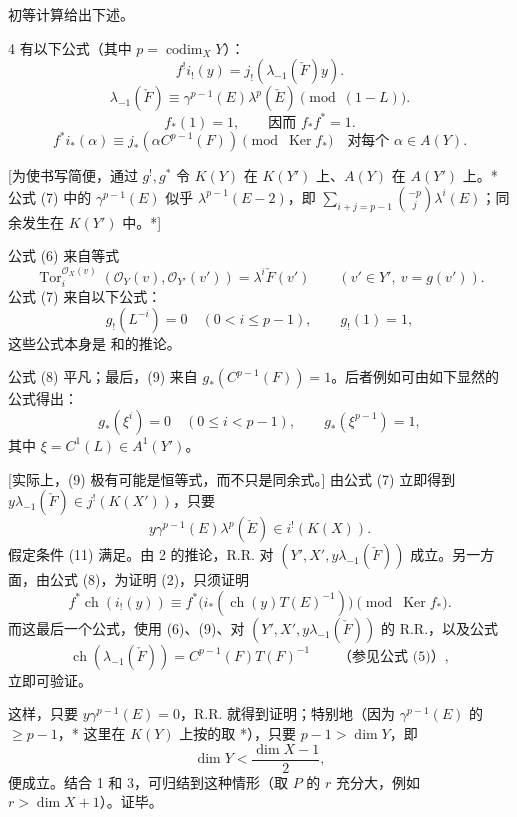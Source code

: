 初等计算给出下述。
\begin{SGAresult}{}{4}
有以下公式（其中 $p=\operatorname{codim}_X Y$）：
\[
f^!i_!(y)=j_!(\lambda_{-1}(\check F)y).\tag{6}
\]
\[
\lambda_{-1}(\check F)\equiv\gamma^{p-1}(E)\lambda^p(\check E)\pmod{(1-L)}.\tag{7}
\]\footnotemark
\[
f_*(1)=1,\qquad\text{因而 }f_*f^*=1.\tag{8}
\]
\[
f^*i_*(\alpha)\equiv j_*(\alpha C^{p-1}(F))\pmod{\operatorname{Ker}f_*}\quad\text{对每个 }\alpha\in A(Y).\tag{9}
\]
\end{SGAresult}
[为使书写简便，通过 $g^!,g^*$ 令 $K(Y)$ 在 $K(Y')$ 上、$A(Y)$ 在 $A(Y')$ 上。* 公式 (7) 中的 $\gamma^{p-1}(E)$ 似乎 $\lambda^{p-1}(E-2)$，即 $\sum_{i+j=p-1}\binom{-p}{j}\lambda^i(E)$；同余发生在 $K(Y')$ 中。*]

公式 (6) 来自等式
\[
\operatorname{Tor}^{\mathcal O_X(v)}_i(\mathcal O_Y(v),\mathcal O_{Y'}(v'))=\lambda^i\check F(v')\qquad(v'\in Y',\ v=g(v')).\tag{6 bis}
\]
公式 (7) 来自以下公式：
\[
g_!(L^{-i})=0\quad(0<i\leq p-1),\qquad g_!(1)=1,\tag{10}
\]
这些公式本身是 和的推论。

公式 (8) 平凡；最后，(9) 来自 $g_*(C^{p-1}(F))=1$。后者例如可由如下显然的公式得出：
\[
g_*(\xi^i)=0\quad(0\leq i<p-1),\qquad g_*(\xi^{p-1})=1,\tag{10 bis}
\]
其中 $\xi=C^1(L)\in A^1(Y')$。

[实际上，(9) 极有可能是恒等式，而不只是同余式。]
由公式 (7) 立即得到 $y\lambda_{-1}(\check F)\in j^!(K(X'))$，只要
\[
y\gamma^{p-1}(E)\lambda^p(\check E)\in i^!(K(X)).\tag{11}
\]
假定条件 (11) 满足。由 2 的推论，R.R. 对 $(Y',X',y\lambda_{-1}(\check F))$ 成立。另一方面，由公式 (8)，为证明 (2)，只须证明
\[
f^*\operatorname{ch}(i_!(y))\equiv f^*\bigl(i_*(\operatorname{ch}(y)T(E)^{-1})\bigr)\pmod{\operatorname{Ker}f_*}.\tag{12}
\]
而这最后一个公式，使用 (6)、(9)、对 $(Y',X',y\lambda_{-1}(\check F))$ 的 R.R.，以及公式
\[
\operatorname{ch}(\lambda_{-1}(\check F))=C^{p-1}(F)T(F)^{-1}\qquad\text{（参见公式 (5)）},\tag{13}
\]
立即可验证。

这样，只要 $y\gamma^{p-1}(E)=0$，R.R. 就得到证明；特别地（因为 $\gamma^{p-1}(E)$ 的 $\geq p-1$，* 这里在 $K(Y)$ 上按的取 *），只要 $p-1>\dim Y$，即
\[
\dim Y<\frac{\dim X-1}{2},
\]
便成立。结合 1 和 3，可归结到这种情形（取 $P$ 的 $r$ 充分大，例如 $r>\dim X+1$）。证毕。

